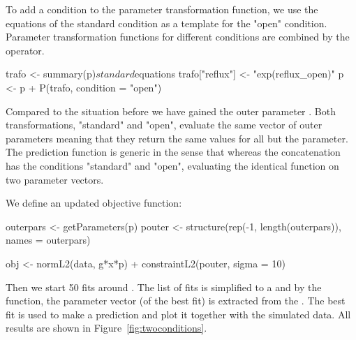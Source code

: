 \documentclass[article]{jss}
\begin{document}
To add a condition to the parameter transformation function, we use the equations of the standard condition as a template for the "open" condition. Parameter transformation functions for different conditions are combined by the  operator.

\begin{CodeChunk}
\begin{CodeInput}
trafo <- summary(p)$standard$equations
trafo["reflux"] <- "exp(reflux_open)"
p <- p + P(trafo, condition = "open")
\end{CodeInput}
\end{CodeChunk}

Compared to the situation before we have gained the outer parameter . Both transformations, "standard" and "open", evaluate the same vector of outer parameters meaning that they return the same values for all but the  parameter. The prediction function  is generic in the sense that  whereas the concatenation  has the conditions "standard" and "open", evaluating the identical function  on two parameter vectors.

We define an updated objective function:
\begin{CodeChunk}
\begin{CodeInput}
outerpars <- getParameters(p)
pouter <- structure(rep(-1, length(outerpars)), names = outerpars)

obj <- normL2(data, g*x*p) + constraintL2(pouter, sigma = 10)
\end{CodeInput}
\end{CodeChunk}

Then we start 50 fits around . The list of fits is simplified to a  and by the  function, the parameter vector (of the best fit) is extracted from the . The best fit is used to make a prediction and plot it together with the simulated data. All results are shown in Figure~\ref{fig:twoconditions}.
\end{document}
